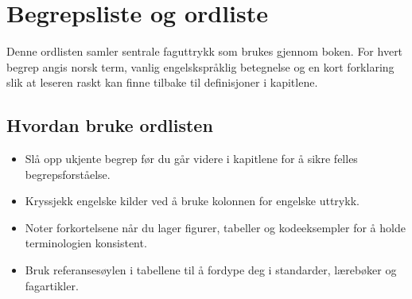 \chapter{Begrepsliste og ordliste}
\label{appendix:ordliste}

Denne ordlisten samler sentrale faguttrykk som brukes gjennom boken. For hvert begrep angis norsk term, vanlig engelskspråklig betegnelse og en kort forklaring slik at leseren raskt kan finne tilbake til definisjoner i kapitlene.

\section{Hvordan bruke ordlisten}
\begin{itemize}
    \item Slå opp ukjente begrep før du går videre i kapitlene for å sikre felles begrepsforståelse.
    \item Kryssjekk engelske kilder ved å bruke kolonnen for engelske uttrykk.
    \item Noter forkortelsene når du lager figurer, tabeller og kodeeksempler for å holde terminologien konsistent.
    \item Bruk referansesøylen i tabellene til å fordype deg i standarder, lærebøker og fagartikler.
\end{itemize}


